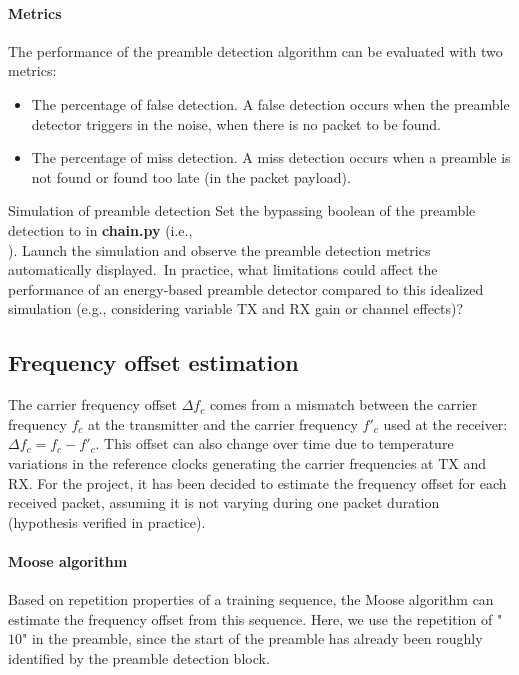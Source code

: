 \paragraph{Metrics} The performance of the preamble detection algorithm can be evaluated with two metrics:
\begin{itemize}
    \item The percentage of false detection. A false detection occurs when the preamble detector triggers in the noise, when there is no packet to be found.
    \item The percentage of miss detection. A miss detection occurs when a preamble is not found or found too late (in the packet payload).
\end{itemize}

\begin{bclogo}[couleur = gray!20, arrondi = 0.2, logo=\bccrayon]{Simulation of preamble detection}
Set the bypassing boolean of the preamble detection to  in \textbf{chain.py}  (i.e.,\\). Launch the simulation and observe the preamble detection metrics automatically displayed.\ In practice, what limitations could affect the performance of an energy-based preamble detector compared to this idealized simulation (e.g., considering variable TX and RX gain or channel effects)?
\end{bclogo}

\subsection{Frequency offset estimation}
The carrier frequency offset $\Delta f_c$ comes from a mismatch between the carrier frequency $f_c$ at the transmitter and the carrier frequency $f'_c$ used at the receiver: $\Delta f_c=f_c-f'_c$. This offset can also change over time due to temperature variations in the reference clocks generating the carrier frequencies at TX and RX. For the project, it has been decided to estimate the frequency offset for each received packet, assuming it is not varying during one packet duration (hypothesis verified in practice).

\paragraph{Moose algorithm} Based on repetition properties of a training sequence, the Moose algorithm can estimate the frequency offset from this sequence. Here, we use the repetition of "$10$" in the preamble, since the start of the preamble has already been roughly identified by the preamble detection block.

